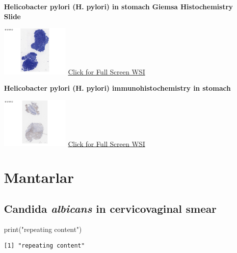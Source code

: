 \documentclass[
  letterpaper,
  paper=6in:9in,
  pagesize=pdftex,
  headinclude=on,
  footinclude=on,
  12pt]{scrbook}
\newenvironment{Shaded}{}{}
\newcommand{\FunctionTok}[1]{\textcolor[rgb]{0.44,0.26,0.76}{#1}}
\newcommand{\NormalTok}[1]{\textcolor[rgb]{0.14,0.16,0.18}{#1}}
\newcommand{\StringTok}[1]{\textcolor[rgb]{0.01,0.18,0.38}{#1}}
\begin{document}
\textbf{Helicobacter pylori (H. pylori) in stomach Giemsa Histochemistry
Slide}

\href{https://images.patolojiatlasi.com/helicobacterpylori/giemsa.html}{\includegraphics[width=0.25\textwidth,height=\textheight]{./screenshots/helicobacterpyloriGiemsa_screenshot.png}}
\href{https://images.patolojiatlasi.com/helicobacterpylori/giemsa.html}{Click
for Full Screen WSI}

\textbf{Helicobacter pylori (H. pylori) immunohistochemistry in stomach}

\href{https://images.patolojiatlasi.com/helicobacterpylori/IHC.html}{\includegraphics[width=0.25\textwidth,height=\textheight]{./screenshots/helicobacterpyloriIHC_screenshot.png}}
\href{https://images.patolojiatlasi.com/helicobacterpylori/IHC.html}{Click
for Full Screen WSI}

\hypertarget{sec-mantarlar}{%
\chapter{Mantarlar}\label{sec-mantarlar}}

\hypertarget{sec-candida-albicans-in-cervicovaginal-smear}{%
\section{\texorpdfstring{Candida \emph{albicans} in cervicovaginal
smear}{Candida albicans in cervicovaginal smear}}\label{sec-candida-albicans-in-cervicovaginal-smear}}

\begin{Shaded}
\begin{Highlighting}[]
\FunctionTok{print}\NormalTok{(}\StringTok{"repeating content"}\NormalTok{)}
\end{Highlighting}
\end{Shaded}

\begin{verbatim}
[1] "repeating content"
\end{verbatim}
\end{document}

